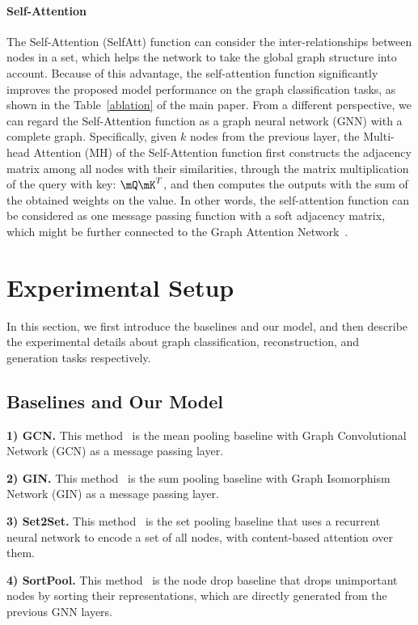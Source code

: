 \paragraph{Self-Attention}
The Self-Attention (SelfAtt) function can consider the inter-relationships between nodes in a set, which helps the network to take the global graph structure into account. Because of this advantage, the self-attention function significantly improves the proposed model performance on the graph classification tasks, as shown in the Table~\ref{ablation} of the main paper. From a different perspective, we can regard the Self-Attention function as a graph neural network (GNN) with a complete graph. Specifically, given $k$ nodes from the previous layer, the Multi-head Attention (MH) of the Self-Attention function first constructs the adjacency matrix among all nodes with their similarities, through the matrix multiplication of the query with key: $\mQ \mK^T$, and then computes the outputs with the sum of the obtained weights on the value. In other words, the self-attention function can be considered as one message passing function with a soft adjacency matrix, which might be further connected to the Graph Attention Network~\citep{GAT}.

\section{Experimental Setup}
In this section, we first introduce the baselines and our model, and then describe the experimental details about graph classification, reconstruction, and generation tasks respectively.


\subsection{Baselines and Our Model \label{appendix/classification/model}}
\textbf{1) GCN.} This method~\citep{GCN} is the mean pooling baseline with Graph Convolutional Network (GCN) as a message passing layer.

\textbf{2) GIN.} This method~\citep{GIN} is the sum pooling baseline with Graph Isomorphism Network (GIN) as a message passing layer.

\textbf{3) Set2Set.} This method~\citep{Set2Set} is the set pooling baseline that uses a recurrent neural network to encode a set of all nodes, with content-based attention over them.

\textbf{4) SortPool.} This method~\citep{SortPool} is the node drop baseline that drops unimportant nodes by sorting their representations, which are directly generated from the previous GNN layers.

